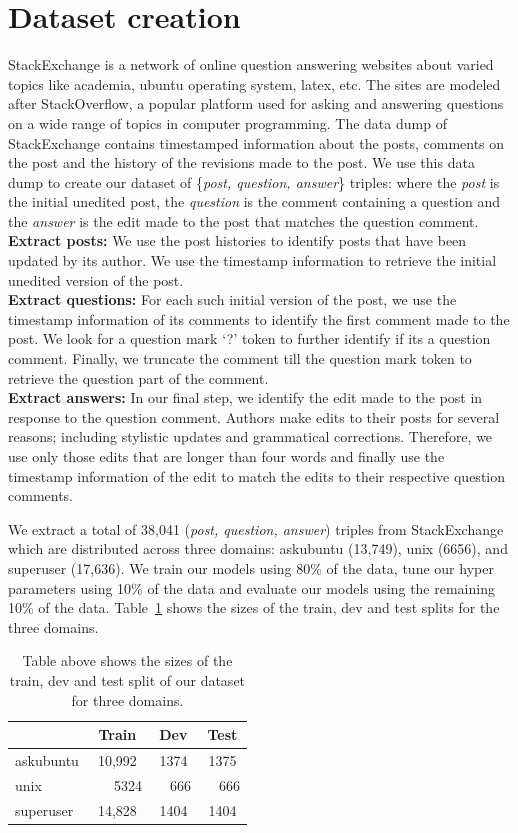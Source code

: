 \documentclass[11pt]{report}
\begin{document}
\section{Dataset creation}\label{dataset_creation}
StackExchange is a network of online question answering websites about varied topics like academia, ubuntu operating system, latex, etc. The sites are modeled after StackOverflow, a popular platform used for asking and answering questions on a wide range of topics in computer programming. The data dump of StackExchange contains timestamped information about the posts, comments on the post and the history of the revisions made to the post. We use this data dump to create our dataset of \{\textit{post, question, answer}\} triples: where the \textit{post} is the initial unedited post, the \textit{question} is the comment containing a question and the \textit{answer} is the edit made to the post that matches the question comment. \\
\textbf{Extract posts:} We use the post histories to identify posts that have been updated by its author. We use the timestamp information to retrieve the initial unedited version of the post.\\
\textbf{Extract questions:} For each such initial version of the post, we use the timestamp information of its comments to identify the first comment made to the post. We look for a question mark `?' token to further identify if its a question comment. Finally, we truncate the comment till the question mark token to retrieve the question part of the comment.\\
\textbf{Extract answers:} In our final step, we identify the edit made to the post in response to the question comment. Authors make edits to their posts for several reasons; including stylistic updates and grammatical corrections. Therefore, we use only those edits that are longer than four words and finally use the timestamp information of the edit to match the edits to their respective question comments.

We extract a total of 38,041 (\textit{post, question, answer}) triples from StackExchange which are distributed across three domains: askubuntu (13,749), unix (6656), and superuser (17,636). We train our models using 80\% of the data, tune our hyper parameters using 10\% of the data and evaluate our models using the remaining 10\% of the data. Table~\ref{data_statistics} shows the sizes of the train, dev and test splits for the three domains. 

\begin{table}
\centering
\begin{tabular}{lccc}
\toprule
& Train & Dev & Test  \\
\midrule
askubuntu & 10,992 & 1374 & 1375\\
unix & ~~~5324 & ~~666 & ~~666 \\
superuser & 14,828 & 1404 & 1404 \\
\bottomrule
\end{tabular}
\label{data_statistics}
\caption{Table above shows the sizes of the train, dev and test split of our dataset for three domains.}
\end{table}
\end{document}
